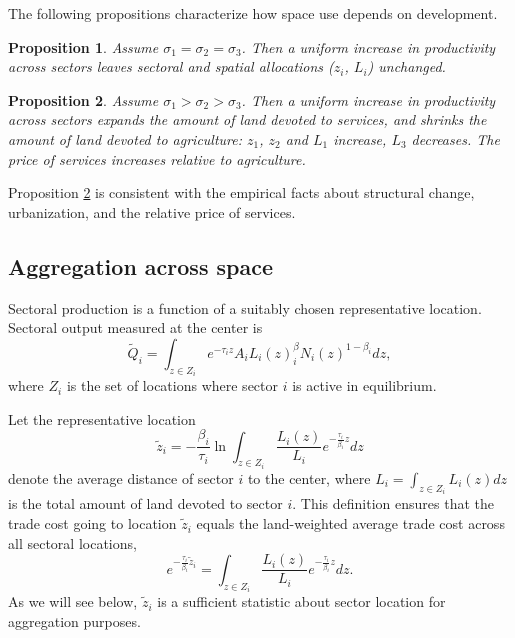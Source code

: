 \documentclass[12pt]{article}
\newtheorem{proposition}{Proposition}
\begin{document}
The following propositions characterize how space use depends on development.
\begin{proposition}\label{prop:balanced_growth}
Assume $\sigma_1=\sigma_2=\sigma_3$. Then a uniform increase in productivity across sectors leaves sectoral and spatial allocations ($z_i$, $L_i$) unchanged.
\end{proposition}

\begin{proposition}\label{prop:comparative_static}
Assume $\sigma_1>\sigma_2>\sigma_3$. Then a uniform increase in productivity across sectors expands the amount of land devoted to services, and shrinks the amount of land devoted to agriculture: $z_1$, $z_2$ and $L_1$ increase, $L_3$ decreases. The price of services increases relative to agriculture.
\end{proposition}

Proposition \ref{prop:comparative_static} is consistent with the empirical facts about structural change, urbanization, and the relative price of services. 

\subsection{Aggregation across space}
Sectoral production is a function of a suitably chosen representative location. Sectoral output measured at the center is
\begin{equation*}
\tilde{Q}_i=\int_{z\in Z_i}e^{-\tau_i z}A_iL_i(z)^\beta_iN_i(z)^{1-\beta_i}dz,
\end{equation*}
where $Z_i$ is the set of locations where sector $i$ is active in equilibrium.

Let the representative location
\begin{equation}
\label{eq:ReprLoc}
\tilde z_i = -
\frac{\beta_i}{\tau_i}
\ln\int_{z\in Z_i} \frac{L_i(z)}{L_i}e^{-\frac{\tau_i}{\beta_i} z}dz
\end{equation}
denote the average distance of sector $i$ to the center, where $L_i=\int_{z\in Z_i} L_i(z)dz$ is the total amount of land devoted to sector $i$. This definition ensures that the trade cost going to location $\tilde z_i$ equals the land-weighted average trade cost across all sectoral locations,
\[
e^{-\frac{\tau_i}{\beta_i} \tilde z_i} = \int_{z\in Z_i} \frac{L_i(z)}{L_i}e^{-\frac{\tau_i}{\beta_i} z}dz.
\]
As we will see below, $\tilde z_i$ is a sufficient statistic about sector location for aggregation purposes. %
\end{document}
